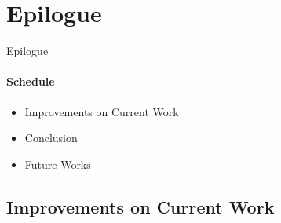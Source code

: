 \section{Epilogue}
     \begin{frame}[t]{Epilogue}\framesubtitle{Schedule}
        \begin{itemize}
            \item Improvements on Current Work
            \item Conclusion
            \item Future Works
        \end{itemize}
    \end{frame}

    \subsection{Improvements on Current Work}
